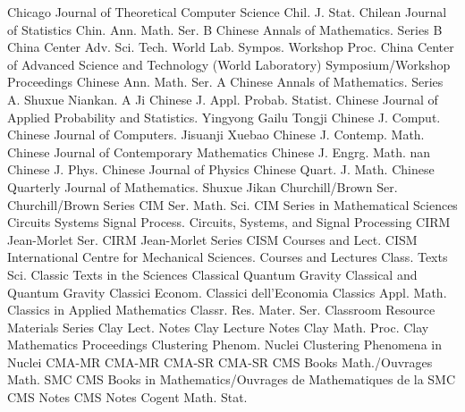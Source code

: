 {Chicago Journal of Theoretical Computer Science}
{Chil. J. Stat.}
{Chilean Journal of Statistics}
{Chin. Ann. Math. Ser. B}
{Chinese Annals of Mathematics. Series B}
{China Center Adv. Sci. Tech. World Lab. Sympos. Workshop Proc.}
{China Center of Advanced Science and Technology (World Laboratory) Symposium/Workshop Proceedings}
{Chinese Ann. Math. Ser. A}
{Chinese Annals of Mathematics. Series A. Shuxue Niankan. A Ji}
{Chinese J. Appl. Probab. Statist.}
{Chinese Journal of Applied Probability and Statistics. Yingyong Gailu Tongji}
{Chinese J. Comput.}
{Chinese Journal of Computers. Jisuanji Xuebao}
{Chinese J. Contemp. Math.}
{Chinese Journal of Contemporary Mathematics}
{Chinese J. Engrg. Math.}
{nan}
{Chinese J. Phys.}
{Chinese Journal of Physics}
{Chinese Quart. J. Math.}
{Chinese Quarterly Journal of Mathematics. Shuxue Jikan}
{Churchill/Brown Ser.}
{Churchill/Brown Series}
{CIM Ser. Math. Sci.}
{CIM Series in Mathematical Sciences}
{Circuits Systems Signal Process.}
{Circuits, Systems, and Signal Processing}
{CIRM Jean-Morlet Ser.}
{CIRM Jean-Morlet Series}
{CISM Courses and Lect.}
{CISM International Centre for Mechanical Sciences. Courses and Lectures}
{Class. Texts Sci.}
{Classic Texts in the Sciences}
{Classical Quantum Gravity}
{Classical and Quantum Gravity}
{Classici Econom.}
{Classici dell'Economia}
{Classics Appl. Math.}
{Classics in Applied Mathematics}
{Classr. Res. Mater. Ser.}
{Classroom Resource Materials Series}
{Clay Lect. Notes}
{Clay Lecture Notes}
{Clay Math. Proc.}
{Clay Mathematics Proceedings}
{Clustering Phenom. Nuclei}
{Clustering Phenomena in Nuclei}
{CMA-MR}
{CMA-MR}
{CMA-SR}
{CMA-SR}
{CMS Books Math./Ouvrages Math. SMC}
{CMS Books in Mathematics/Ouvrages de Mathematiques de la SMC}
{CMS Notes}
{CMS Notes}
{Cogent Math. Stat.}
